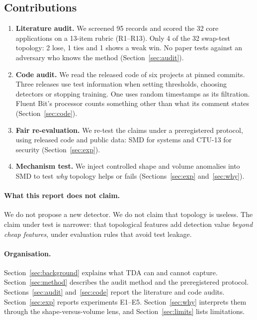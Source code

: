 \subsection{Contributions}
\begin{enumerate}
  \item \textbf{Literature audit.} We screened 95 records and scored the 32 core applications on a 13-item rubric (R1--R13). Only 4 of the 32 swap-test topology: 2 lose, 1 ties and 1 shows a weak win. No paper tests against an adversary who knows the method (Section~\ref{sec:audit}).
  \item \textbf{Code audit.} We read the released code of six projects at pinned commits. Three releases use test information when setting thresholds, choosing detectors or stopping training. One uses random timestamps as its filtration. Fluent Bit's  processor counts something other than what its comment states (Section~\ref{sec:code}).
  \item \textbf{Fair re-evaluation.} We re-test the claims under a preregistered protocol, using released code and public data: SMD for systems and CTU-13 for security (Section~\ref{sec:exp}).
  \item \textbf{Mechanism test.} We inject controlled shape and volume anomalies into SMD to test \emph{why} topology helps or fails (Sections~\ref{sec:exp} and~\ref{sec:why}).
\end{enumerate}

\paragraph{What this report does not claim.} We do not propose a new detector. We do not claim that topology is useless. The claim under test is narrower: that topological features add detection value \emph{beyond cheap features}, under evaluation rules that avoid test leakage.

\paragraph{Organisation.} Section~\ref{sec:background} explains what TDA can and cannot capture. Section~\ref{sec:method} describes the audit method and the preregistered protocol. Sections~\ref{sec:audit} and~\ref{sec:code} report the literature and code audits. Section~\ref{sec:exp} reports experiments E1--E5. Section~\ref{sec:why} interprets them through the shape-versus-volume lens, and Section~\ref{sec:limits} lists limitations.
